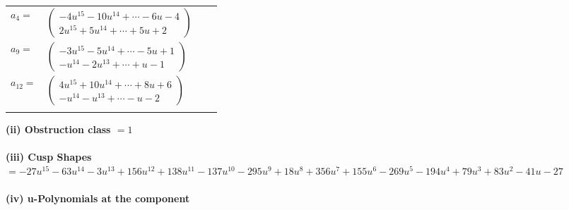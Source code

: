 \documentclass[1p]{elsarticle_modified}
\theoremstyle{definition}
\begin{document}
\begin{tabular}{m{7pt} m{180pt} m{7pt} m{180pt} }
\flushright $a_{4}=$&$\begin{pmatrix}-4 u^{15}-10 u^{14}+\cdots-6 u-4\\2 u^{15}+5 u^{14}+\cdots+5 u+2\end{pmatrix}$ \\
\flushright $a_{9}=$&$\begin{pmatrix}-3 u^{15}-5 u^{14}+\cdots-5 u+1\\- u^{14}-2 u^{13}+\cdots+u-1\end{pmatrix}$ \\
\flushright $a_{12}=$&$\begin{pmatrix}4 u^{15}+10 u^{14}+\cdots+8 u+6\\- u^{14}- u^{13}+\cdots- u-2\end{pmatrix}$\\&\end{tabular}
\flushleft \textbf{(ii) Obstruction class $= 1$}\\~\\
\flushleft \textbf{(iii) Cusp Shapes $= -27 u^{15}-63 u^{14}-3 u^{13}+156 u^{12}+138 u^{11}-137 u^{10}-295 u^9+18 u^8+356 u^7+155 u^6-269 u^5-194 u^4+79 u^3+83 u^2-41 u-27$}\\~\\
\newpage\renewcommand{\arraystretch}{1}
\flushleft \textbf{(iv) u-Polynomials at the component}\newline \\
\end{document}
